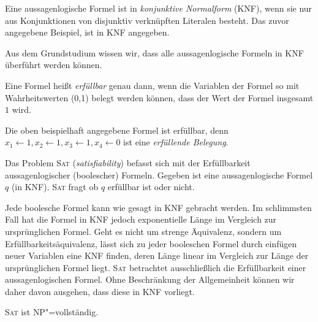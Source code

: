 \begin{Def}
  \hspace{\parindent}Eine aussagenlogische Formel ist in \textit{konjunktive Normalform} (KNF), wenn sie nur aus Konjunktionen von disjunktiv verknüpften Literalen besteht. Das zuvor angegebene Beispiel, ist in KNF angegeben.
\end{Def}

\begin{Anm}
  \hspace{\parindent}Aus dem Grundstudium wissen wir, dass alle aussagenlogische Formeln in KNF überführt werden können.
\end{Anm}

\begin{Def}
  \hspace{\parindent}Eine Formel heißt \textit{erfüllbar} genau dann, wenn die Variablen der Formel so mit Wahrheitswerten (0,1) belegt werden können, dass der Wert der Formel insgesamt $1$ wird.
\end{Def}

Die oben beispielhaft angegebene Formel ist erfüllbar, denn $x_1 \leftarrow 1, x_2 \leftarrow 1, x_3 \leftarrow 1, x_4 \leftarrow 0$ ist eine \textit{erfüllende Belegung}.

Das Problem \textsc{Sat} (\textit{satisfiability}) befasst sich mit der Erfüllbarkeit aussagenlogischer (boolescher) Formeln. Gegeben ist eine aussagenlogische Formel $q$ (in KNF). \textsc{Sat} fragt ob $q$ erfüllbar ist oder nicht.

\begin{Anm}
  \hspace{\parindent}Jede boolesche Formel kann wie gesagt in KNF gebracht werden. Im schlimmsten Fall hat die Formel in KNF jedoch exponentielle Länge im Vergleich zur ursprünglichen Formel. Geht es nicht um strenge Äquivalenz, sondern um Erfüllbarkeitsäquivalenz, lässt sich zu jeder booleschen Formel durch einfügen neuer Variablen eine KNF finden, deren Länge linear im Vergleich zur Länge der ursprünglichen Formel liegt. \textsc{Sat} betrachtet ausschließlich die Erfüllbarkeit einer aussagenlogischen Formel. Ohne Beschränkung der Allgemeinheit können wir daher davon ausgehen, dass diese in KNF vorliegt.
\end{Anm}

\begin{Satz}
  \hspace{\parindent}\textsc{Sat} ist \textsf{NP}"=vollständig.
\end{Satz}

